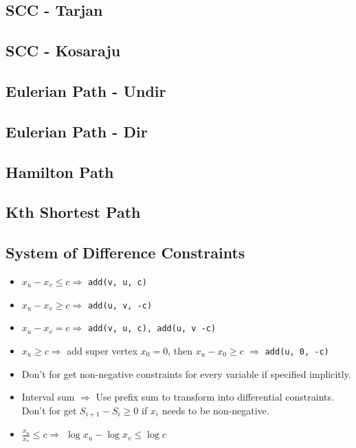 \documentclass[a4paper,10pt,twocolumn,oneside,x11names]{article}
\begin{document}
\subsection{SCC - Tarjan}


\subsection{SCC - Kosaraju}


\subsection{Eulerian Path - Undir}


\subsection{Eulerian Path - Dir}


\subsection{Hamilton Path}


\subsection{Kth Shortest Path}


\subsection{System of Difference Constraints}

\begin{itemize}
	\item $x_u - x_v \le c \Rightarrow$ \texttt{add(v, u, c)}
	\item $x_u - x_v \ge c \Rightarrow$ \texttt{add(u, v, -c)}
	\item $x_u - x_v = c \Rightarrow$ \texttt{add(v, u, c), add(u, v -c)}
	\item $x_u \ge c \Rightarrow$ add super vertex $x_0 = 0$, then $x_u - x_0 \ge c$ $\Rightarrow$ \texttt{add(u, 0, -c)}
	\item Don't for get non-negative constraints for every variable if specified implicitly.
	\item Interval sum $\Rightarrow$ Use prefix sum to transform into differential constraints.  Don't for get $S_{i+1} - S_{i} \ge 0$ if $x_i$ needs to be non-negative.
	\item $\frac{x_u}{x_v} \le c \Rightarrow$ $\log{x_u} - \log{x_v} \le \log{c}$
\end{itemize}
\end{document}
